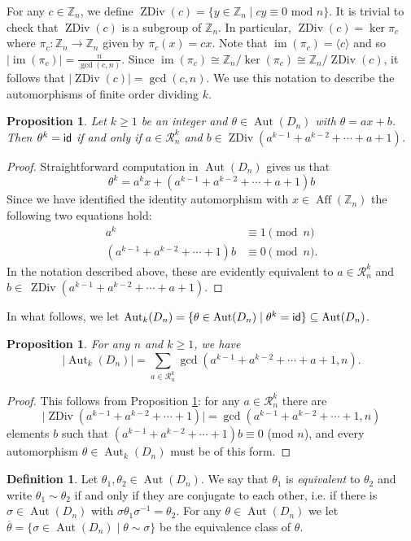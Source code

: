 \documentclass[12pt]{amsart}
\numberwithin{equation}{section}
\newtheorem{prop}[theorem]{Proposition}
\theoremstyle{definition}
\newtheorem{definition}[theorem]{Definition}
\newcommand{\abs}[1]{\lvert #1 \rvert}
\newcommand{\Aut}{\operatorname{Aut}}
\newcommand{\Aff}{\operatorname{Aff}}
\newcommand{\Z}{\mathbb{Z}}
\newcommand{\zdiv}[1]{{\operatorname{ZDiv}(#1)}}
\newcommand{\im}{\operatorname{im}}
\renewcommand{\ker}{\operatorname{ker}}
\renewcommand{\Z}{\mathbb{Z}}
\begin{document}
For any $c\in\Z_n$, we define $\zdiv{c}=\{y\in\Z_n\mid cy\equiv 0
\mbox{ mod } n\}$. It is trivial to check that $\zdiv{c}$ is a
subgroup of $\Z_n$. In particular, $\zdiv{c}=\ker\pi_{c}$ where
$\pi_{c}:\Z_n\to\Z_n$ given by $\pi_{c}(x)=cx$. Note that
$\im(\pi_{c})=\langle c\rangle$ and so
$|\im(\pi_{c})|=\frac{n}{\gcd(c,n)}$. Since $\im(\pi_{c})\cong
\Z_n/\ker(\pi_{c})\cong \Z_n/\zdiv{c}$, it follows that
$|\zdiv{c}|=\gcd(c,n)$. We use this notation to describe the automorphisms of finite order dividing $k$. 
\begin{prop}
\label{prop:orderk}
Let $k\geq 1$ be an integer and $\theta\in\Aut(D_n)$ with
$\theta=ax+b$. Then $\theta^k={\sf id}$ if and only if $a\in\mathcal{R}_n^k$ and $b\in \zdiv{a^{k-1}+a^{k-2}+\cdots +a+1}$.
\end{prop}
\begin{proof}
Straightforward computation in $\Aut(D_n)$ gives us that 
$$\theta^k=a^kx+(a^{k-1}+a^{k-2}+\cdots +a+1)b$$
Since we have identified the identity automorphism with $x \in \Aff(\Z_n)$
the following two equations hold:
\begin{equation}
\label{congruences}
\begin{aligned}
a^k & \equiv 1 \pmod{n} \\
(a^{k-1} + a^{k-2} + \cdots + 1) b & \equiv 0 \pmod{n}.
\end{aligned}
\end{equation}
In the notation described above, these are evidently equivalent to $a\in\mathcal{R}_n^k$ and\\ 
$b\in~\zdiv{a^{k-1}+a^{k-2}+\cdots +a+1}$.
\end{proof}

In what follows, we let $\Aut_k(D_n)=\{\theta\in\Aut(D_n) \mid \theta^k={\sf id}\}\subseteq \Aut(D_n)$.
\begin{prop}
\label{prop:numauts}
For any $n$ and $k\geq 1$, we have
$$|\Aut_k(D_n)|=\sum_{a\in \mathcal{R}_n^k}\gcd(a^{k-1}+a^{k-2}+\cdots+a+1,n).$$
\end{prop}

\begin{proof}
This follows from Proposition \ref{prop:orderk}: for any $a\in\mathcal{R}_n^k$ there are 
$$\abs{\zdiv{a^{k-1}+a^{k-2}+\cdots+1}}=\gcd(a^{k-1}+a^{k-2}+\cdots+1,n)$$ elements $b$ such that
$(a^{k-1}+a^{k-2}+\cdots+1)b\equiv 0$ (mod $n$), and every automorphism $\theta\in\Aut_k(D_n)$ must be of this form.
\end{proof}

\begin{definition} Let $\theta_1, \theta_2\in\Aut(D_n)$. 
We say that $\theta_1$ is
\textit{equivalent} to $\theta_2$ and write $\theta_1\sim\theta_2$ if
and only if they are conjugate to each other, i.e. if there is
$\sigma\in\Aut(D_n)$ with $\sigma\theta_1\sigma^{-1}=\theta_2$. For any $\theta\in\Aut(D_n)$ we let $\overline{\theta}=\{\sigma\in\Aut(D_n)\mid \theta\sim \sigma\}$ be the equivalence class of $\theta$. 
\end{definition}
\end{document}
